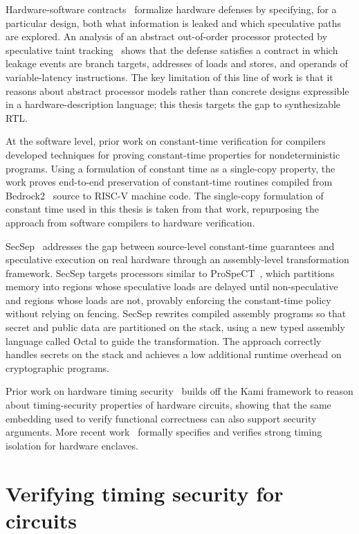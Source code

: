 \documentclass[fontset=fira-newtxsf]{mitthesis}
\theoremstyle{definition}
\theoremstyle{plain}
\begin{document}
Hardware-software contracts~\cite{guarnieri2021} formalize hardware defenses by specifying, for a particular design, both what information is leaked and which speculative paths are explored.
An analysis of an abstract out-of-order processor protected by speculative taint tracking~\cite{yu2019} shows that the defense satisfies a contract in which leakage events are branch targets, addresses of loads and stores, and operands of variable-latency instructions.
The key limitation of this line of work is that it reasons about abstract processor models rather than concrete designs expressible in a hardware-description language; this thesis targets the gap to synthesizable RTL.

At the software level, prior work on constant-time verification for compilers~\cite{conoly2025} developed techniques for proving constant-time properties for nondeterministic programs.
Using a formulation of constant time as a single-copy property, the work proves end-to-end preservation of constant-time routines compiled from Bedrock2~\cite{erbsen2021} source to RISC-V machine code.
The single-copy formulation of constant time used in this thesis is taken from that work, repurposing the approach from software compilers to hardware verification.

SecSep~\cite{song2025} addresses the gap between source-level constant-time guarantees and speculative execution on real hardware through an assembly-level transformation framework.
SecSep targets processors similar to ProSpeCT~\cite{daniel2023}, which partitions memory into regions whose speculative loads are delayed until non-speculative and regions whose loads are not, provably enforcing the constant-time policy without relying on fencing.
SecSep rewrites compiled assembly programs so that secret and public data are partitioned on the stack, using a new typed assembly language called Octal to guide the transformation.
The approach correctly handles secrets on the stack and achieves a low additional runtime overhead on cryptographic programs.

Prior work on hardware timing security~\cite{duxovni2018} builds off the Kami framework to reason about timing-security properties of hardware circuits, showing that the same embedding used to verify functional correctness can also support security arguments.
More recent work~\cite{lau2024} formally specifies and verifies strong timing isolation for hardware enclaves.

\chapter{Verifying timing security for circuits} \label{chap:Slate}
\end{document}
